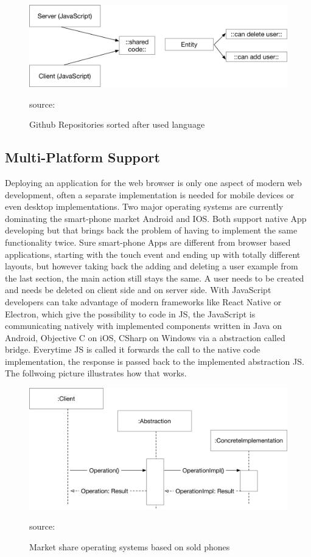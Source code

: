 \begin{figure}[hb]
	\centering
	\includegraphics[scale=0.6]{bilder/grundlagen/Entity2.png}
	\caption{Github Repositories sorted after used language} source:\cite{JS}
	\label{fig:JS}
\end{figure}


\subsection{Multi-Platform Support}

Deploying an application for the web browser is only one aspect of modern web development, often a separate implementation is needed for mobile devices or even desktop implementations. Two major operating systems are currently dominating the smart-phone market Android and IOS. Both support native App developing but that brings back the problem of having to implement the same functionality twice. Sure smart-phone Apps are different from browser based applications, starting with the touch event and ending up with totally different layouts, but however taking back the adding and deleting a user example from the last section, the main action still stays the same. A user needs to be created and needs be deleted on client side and on server side. With JavaScript developers can take advantage of modern frameworks like React Native or Electron, which give the possibility to code in \gls{JS}, the JavaScript is communicating natively with implemented components written in Java on Android, Objective C on iOS, CSharp on Windows via a abstraction called bridge. Everytime \gls{JS} is called it forwards the call to the native code implementation, the response is passed back to the implemented abstraction \gls{JS}. The follwoing picture illustrates how that works.

\begin{figure}[hb]
	\centering
	\includegraphics[scale=0.6]{bilder/grundlagen/BridgePattern.png}
	\caption{Market share operating systems based on sold phones} source:\cite{JS}
	\label{fig:MS}
\end{figure}



